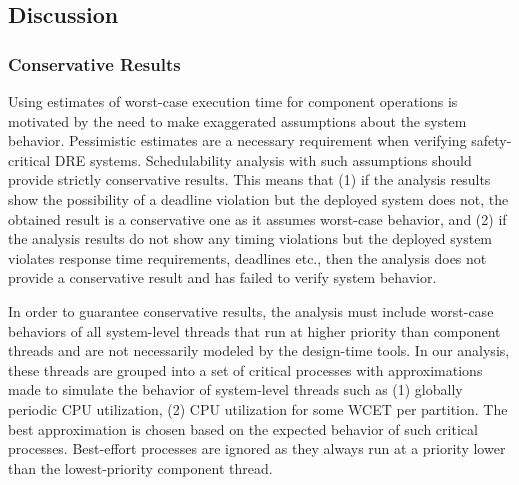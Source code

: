 
\subsection{Discussion}

\subsubsection{Conservative Results}

Using estimates of worst-case execution time for component operations is motivated by the need to make exaggerated assumptions about the system behavior. Pessimistic estimates are a necessary requirement when verifying safety-critical DRE systems. Schedulability analysis with such assumptions should  provide strictly conservative results. This means that (1) if the analysis results show the possibility of a deadline violation but the deployed system does not, the obtained result is a conservative one as it assumes worst-case behavior, and (2) if the analysis results do not show any timing violations but the deployed system violates response time requirements, deadlines etc., then the analysis does not provide a conservative result and has failed to verify system behavior.

In order to guarantee conservative results, the analysis must include worst-case behaviors of all system-level threads that run at higher priority than component threads and are not necessarily modeled by the design-time tools. In our analysis, these threads are grouped into a set of critical processes with approximations made to simulate the behavior of system-level threads such as (1) globally periodic CPU utilization, (2) CPU utilization for some WCET per partition. The best approximation is chosen based on the expected behavior of such critical processes. Best-effort processes are ignored as they always run at a priority lower than the lowest-priority component thread. 


